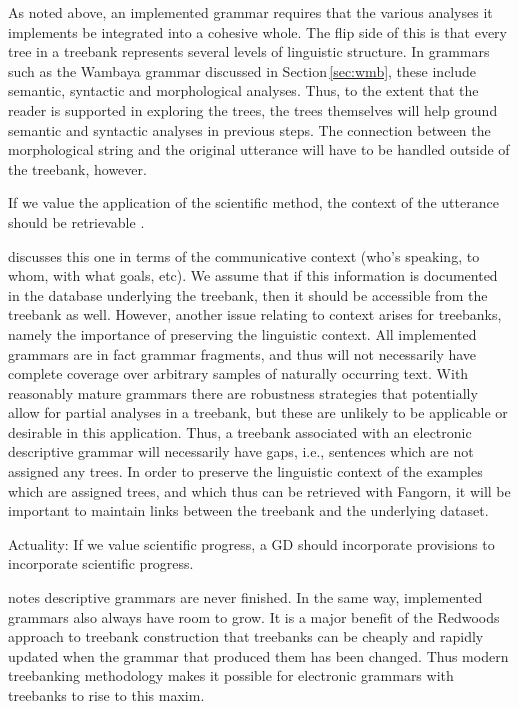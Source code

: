 \documentclass[12pt]{article}
\newcommand{\sref}[1]{Section$\,$\ref{#1}}
\begin{document}
As noted above, an implemented grammar requires that the various
analyses it implements be integrated into a cohesive whole.  The
flip side of this is that every tree in a treebank represents several
levels of linguistic structure.  In grammars such as the Wambaya
grammar discussed in \sref{sec:wmb}, these include semantic, syntactic
and morphological analyses.  Thus, to the extent that the reader is
supported in exploring the trees, the trees themselves will help
ground semantic and syntactic analyses in previous steps.  The connection
between the morphological string and the original utterance will have
to be handled outside of the treebank, however.

\begin{exe}
 If we value the application of the
scientific method, the context of the utterance should be retrievable
\cite[450]{Weber:06}.
\end{exe}

\citeauthor{Nordhoff:08} discusses this one in terms of the communicative
context (who's speaking, to whom, with what goals, etc).  We assume that if this
information is documented in the database underlying the treebank, then it
should be accessible from the treebank as well.  However, another issue relating
to context arises for treebanks, namely the importance of preserving the
linguistic context.  All implemented grammars are in fact grammar fragments, and
thus will not necessarily have complete coverage over arbitrary samples of
naturally occurring text.  With reasonably mature grammars there are robustness
strategies \cite{Kie:Kri:Car:Mal:99,Rie:Kin:Cro:Max:Kap:02} that potentially allow for partial analyses
in a treebank, but these are unlikely to be applicable or desirable in this
application.  Thus, a treebank associated with an electronic descriptive grammar
will necessarily have gaps, i.e., sentences which are not assigned any trees. In
order to preserve the linguistic context of the examples which are assigned
trees, and which thus can be retrieved with Fangorn, it will be
important to maintain links between the treebank and the underlying dataset.

\begin{exe}
\ex\label{ex:act} {\sc Actuality:} If we value scientific progress, a
GD should incorporate provisions to incorporate scientific progress.
\end{exe}

\citeauthor{Nordhoff:08} notes descriptive grammars are never
finished.  In the same way, implemented grammars also always have room
to grow.  It is a major benefit of the Redwoods approach
to treebank construction \cite{Oep:Fli:Tou:04} that treebanks can be
cheaply and rapidly updated when the grammar that produced them has
been changed.  Thus modern treebanking methodology makes it possible
for electronic grammars with treebanks to rise to this maxim.
\end{document}
